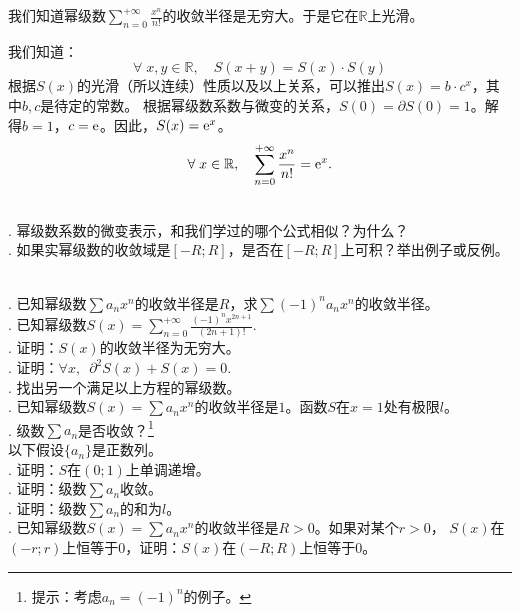 \documentclass[12pt,UTF8]{ctexbook}
\begin{document}
\begin{so}
    我们知道幂级数$\sum_{n=0}^{+\infty} \frac{x^n}{n!}$的收敛半径是无穷大。于是它在$\mathbb{R}$上光滑。

    我们知道：
    $$ \forall \; x, y \in \mathbb{R}, \quad S(x + y) = S(x)\cdot S(y) $$
    根据$S(x)$的光滑（所以连续）性质以及以上关系，可以推出$S(x) = b\cdot c^x$，其中$b,c$是待定的常数。
    根据幂级数系数与微变的关系，$S(0) = \partial S(0) = 1$。解得$b=1$，$c=\mathrm{e}$。因此，$S(x) = \mathrm{e}^x$。
    $$ \forall \;x\in\mathbb{R}, \quad \sum_{n=0}^{+\infty} \frac{x^n}{n!} = \mathrm{e}^x. $$
\end{so}


\begin{sk}
    \mbox{} \\
    . 幂级数系数的微变表示，和我们学过的哪个公式相似？为什么？\\
    . 如果实幂级数的收敛域是$[-R;R]$，是否在$[-R;R]$上可积？举出例子或反例。
\end{sk}

\begin{xt}    
    \mbox{} \\
    . 已知幂级数$\sum a_n x^n$的收敛半径是$R$，求$\sum (-1)^n a_n x^n$的收敛半径。\\
    . 已知幂级数$S(x) = \sum_{n=0}^{+\infty} \frac{(-1)^n x^{2n+1}}{(2n+1)!}. $\\
    . 证明：$S(x)$的收敛半径为无穷大。\\
    . 证明：$\forall x,\,\,\,\partial^2 S(x) + S(x) = 0.$ \\
    . 找出另一个满足以上方程的幂级数。\\
    . 已知幂级数$S(x) = \sum a_n x^n$的收敛半径是$1$。函数$S$在$x=1$处有极限$l$。\\
    . 级数$\sum a_n$是否收敛？\footnote{提示：考虑$a_n = (-1)^n$的例子。}\\
    \indent 以下假设$\{a_n\}$是正数列。\\
    . 证明：$S$在$(0;1)$上单调递增。\\
    . 证明：级数$\sum a_n$收敛。\\
    . 证明：级数$\sum a_n$的和为$l$。\\
    . 已知幂级数$S(x) = \sum a_n x^n$的收敛半径是$R>0$。如果对某个$r>0$，
    $S(x)$在$(-r;r)$上恒等于$0$，证明：$S(x)$在$(-R;R)$上恒等于$0$。
\end{xt}
\end{document}
